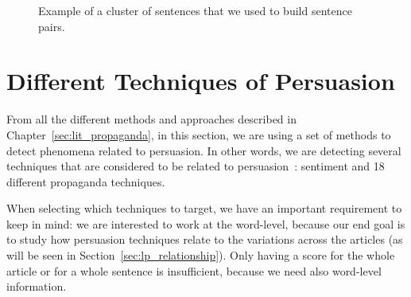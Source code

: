 \begin{figure}[!htbp]
    \centering
    \caption{Example of a cluster of sentences that we used to build sentence pairs.}
    \label{fig:raw_clique_data}
\end{figure}






\section{Different Techniques of Persuasion}
\label{sec:lp_techniques}


From all the different methods and approaches described in Chapter~\ref{sec:lit_propaganda}, in this section, we are using a set of methods to detect phenomena related to persuasion. %
In other words, we are detecting several techniques that are considered 
to be related to persuasion~\citep{gass2018persuasion}: sentiment and 18 different propaganda techniques.%


When selecting which techniques to target, we have an important requirement to keep in mind: we are interested to work at the word-level, because our end goal is to study how persuasion techniques relate to the variations across the articles (as will be seen in Section~\ref{sec:lp_relationship}). Only having a score for the whole article or for a whole sentence is insufficient, because we need also word-level information.

